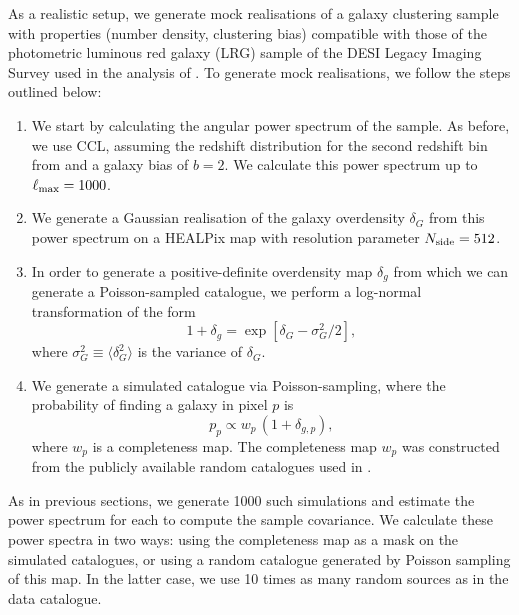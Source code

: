 \documentclass[%
 reprint,
superscriptaddress,
nofootinbib,
 amsmath,amssymb,
 aps,
 prd,
]{revtex4-2}
\begin{document}
    As a realistic setup, we generate mock realisations of a galaxy clustering sample with properties (number density, clustering bias) compatible with those of the photometric luminous red galaxy (LRG) sample of the DESI Legacy Imaging Survey \cite{2309.06443,2407.04607} used in the analysis of \cite{2407.04607,2510.17796}. To generate mock realisations, we follow the steps outlined below:
    \begin{enumerate}
      \item We start by calculating the angular power spectrum of the sample. As before, we use CCL, assuming the redshift distribution for the second redshift bin from \cite{2407.04607} and a galaxy bias of $b=2$. We calculate this power spectrum up to $\ell_{\rm max}=1000$.
      \item We generate a Gaussian realisation of the galaxy overdensity $\delta_G$ from this power spectrum on a HEALPix \cite{astro-ph/0409513} map with resolution parameter $N_{\rm side}=512$.
      \item In order to generate a positive-definite overdensity map $\delta_g$ from which we can generate a Poisson-sampled catalogue, we perform a log-normal transformation \cite{1991MNRAS.248....1C,2111.05069,2302.01942} of the form
      \begin{equation}
        1+\delta_g=\exp[\delta_G-\sigma_G^2/2],
      \end{equation}
      where $\sigma_G^2\equiv\langle\delta_G^2\rangle$ is the variance of $\delta_G$.
      \item We generate a simulated catalogue via Poisson-sampling, where the probability of finding a galaxy in pixel $p$ is
      \begin{equation}
        p_p\propto w_p\,(1+\delta_{g,p}),
      \end{equation}
      where $w_p$ is a completeness map. The completeness map $w_p$ was constructed from the publicly available random catalogues used in \cite{2407.04607}.
    \end{enumerate}
    As in previous sections, we generate 1000 such simulations and estimate the power spectrum for each to compute the sample covariance. We calculate these power spectra in two ways: using the completeness map as a mask on the simulated catalogues, or using a random catalogue generated by Poisson sampling of this map. In the latter case, we use 10 times as many random sources as in the data catalogue.
    
\end{document}
